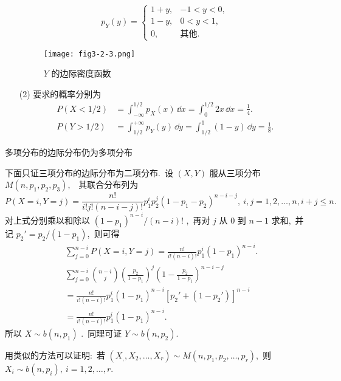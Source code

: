 \begin{solution}
\begin{itemize}
\begin{equation*}
  		p_{Y}(y)=
  		\begin{cases}
  		1+y, & -1<y<0,\\
  		1-y, & 0<y<1,\\
  		0, & \text{其他}.
  		\end{cases}
  		\end{equation*}
  		\begin{figure}[h]
  			\centering
  			\texttt{[image: fig3-2-3.png]}
  			\caption{ $Y$ 的边际密度函数}\label{fig:3.2.3}
  		\end{figure}
  		\item[(2)] 要求的概率分别为
  		\begin{align*}
  		P(X<1/2) &= \int_{-\infty}^{1/2}p_{X}(x)\,\dd x=\int_{0}^{1/2}2x\,\dd x=\frac{1}{4}.\\
  		P(Y>1/2) &= \int_{1/2}^{+\infty}p_{Y}(y)\,\dd y=\int_{1/2}^{1}(1-y)\,\dd y=\frac{1}{8}.
  		\end{align*}
  	\end{itemize}
  \end{solution}
  
  \begin{example}\label{exam:3.2.4}
  	多项分布的边际分布仍为多项分布
  \end{example}
  \begin{solution}
  	下面只证三项分布的边际分布为二项分布.\ 设 $(X,Y)$ 服从三项分布 $M(n,p_1,p_2,p_3),$ \ 其联合分布列为
  	\begin{equation*}
  	P(X=i,Y=j)=\frac{n!}{i!j!(n-i-j)!}p_1^ip_2^j(1-p_1-p_2)^{n-i-j},\ i,j=1,2,\ldots,n,i+j\leqslant n.
  	\end{equation*}
  	对上式分别乘以和除以 $(1-p_1)^{n-i}/(n-i)!$ ,\ 再对 $j$ 从 $0$ 到 $n-1$ 求和,\ 并记 $p_2'=p_2/(1-p_1)$,\ 则可得
  	\begin{align*}
  	&\sum_{j=0}^{n-i}P(X=i,Y=j) = \frac{n!}{i!(n-i)!}p_1^i(1-p_1)^{n-i}.\\
  	&\sum_{j=0}^{n-i} \binom{n-i}{j} \left(\frac{p_2}{1-p_1}\right)^{j}\left(1-\frac{p_2}{1-p_1}\right)^{n-i-j} \\
  	&= \frac{n!}{i!(n-i)!}p_1^i(1-p_1)^{n-i}\left[p_2'+(1-p_2')\right]^{n-i}\\
  	&= \frac{n!}{i!(n-i)!}p_1^i(1-p_1)^{n-i}.
  	\end{align*}
  	所以 $X\sim b(n,p_1)$ .\ 同理可证 $Y\sim b(n,p_2)$.
  	
  	用类似的方法可以证明:\ 若 $(X_,,X_2,\ldots,X_r)\sim M(n,p_1,p_2,\ldots,p_r)$,\ 则 $X_i\sim b(n,p_i),\ i=1,2,\ldots,r$.
  \end{solution}
  
